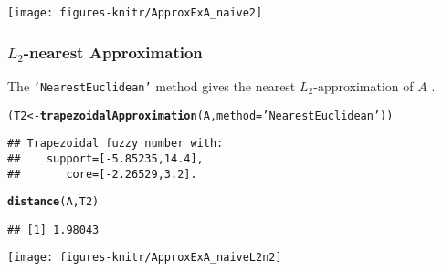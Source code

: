 \documentclass[11pt]{article}\usepackage{graphicx, color}
\makeatletter
\newcommand{\hlfunctioncall}[1]{\textcolor[rgb]{0.501960784313725,0,0.329411764705882}{\textbf{#1}}}%
\newcommand{\hlstring}[1]{\textcolor[rgb]{0.6,0.6,1}{#1}}%
\newenvironment{kframe}{%
 \def\at@end@of@kframe{}%
 \ifinner\ifhmode%
  \def\at@end@of@kframe{\end{minipage}}%
  \begin{minipage}{\columnwidth}%
 \fi\fi%
 \def\FrameCommand##1{\hskip\@totalleftmargin \hskip-\fboxsep
 \colorbox{shadecolor}{##1}\hskip-\fboxsep
     \hskip-\linewidth \hskip-\@totalleftmargin \hskip\columnwidth}%
 \MakeFramed {\advance\hsize-\width
   \@totalleftmargin\z@ \linewidth\hsize
   \@setminipage}}%
 {\par\unskip\endMakeFramed%
 \at@end@of@kframe}
\newenvironment{knitrout}{}{} %
\makeatother
\begin{document}
\begin{center}
\begin{knitrout}\small
{}\color{fgcolor}

{\centering \texttt{[image: figures-knitr/ApproxExA\_naive2]} 

}



\end{knitrout}

\end{center}



\subsubsection{$L_2$-nearest Approximation}


The \texttt{'NearestEuclidean'} method
gives the nearest $L_2$-approximation of $A$
\cite[Corollary 8]{Ban2009:nearestfnrev}.


\begin{knitrout}\small
{}\color{fgcolor}\begin{kframe}
\begin{alltt}
(T2 <- \hlfunctioncall{trapezoidalApproximation}(A, method=\hlstring{'NearestEuclidean'}))
\end{alltt}
\begin{verbatim}
## Trapezoidal fuzzy number with:
##    support=[-5.85235,14.4],
##       core=[-2.26529,3.2].
\end{verbatim}
\begin{alltt}
\hlfunctioncall{distance}(A, T2)
\end{alltt}
\begin{verbatim}
## [1] 1.98043
\end{verbatim}
\end{kframe}
\end{knitrout}


\begin{center}
\begin{knitrout}\small
{}\color{fgcolor}

{\centering \texttt{[image: figures-knitr/ApproxExA\_naiveL2n2]} 

}



\end{knitrout}

\end{center}
\end{document}
